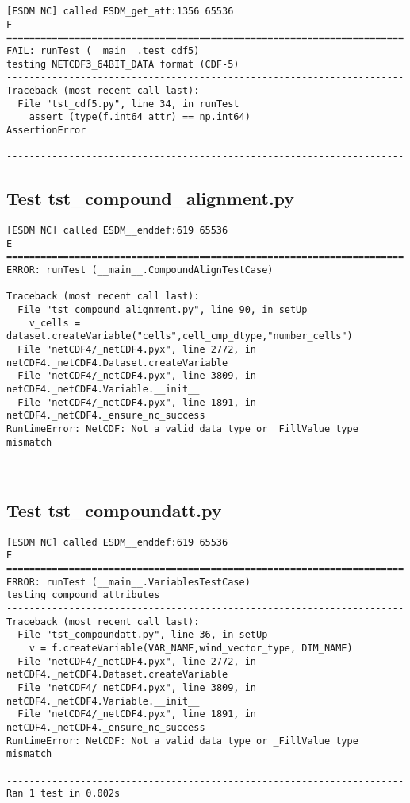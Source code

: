 \begin{verbatim}
[ESDM NC] called ESDM_get_att:1356 65536
F
======================================================================
FAIL: runTest (__main__.test_cdf5)
testing NETCDF3_64BIT_DATA format (CDF-5)
----------------------------------------------------------------------
Traceback (most recent call last):
  File "tst_cdf5.py", line 34, in runTest
    assert (type(f.int64_attr) == np.int64)
AssertionError

----------------------------------------------------------------------
\end{verbatim}

\subsection{Test tst\_compound\_alignment.py}

\begin{verbatim}
[ESDM NC] called ESDM__enddef:619 65536
E
======================================================================
ERROR: runTest (__main__.CompoundAlignTestCase)
----------------------------------------------------------------------
Traceback (most recent call last):
  File "tst_compound_alignment.py", line 90, in setUp
    v_cells = dataset.createVariable("cells",cell_cmp_dtype,"number_cells")
  File "netCDF4/_netCDF4.pyx", line 2772, in netCDF4._netCDF4.Dataset.createVariable
  File "netCDF4/_netCDF4.pyx", line 3809, in netCDF4._netCDF4.Variable.__init__
  File "netCDF4/_netCDF4.pyx", line 1891, in netCDF4._netCDF4._ensure_nc_success
RuntimeError: NetCDF: Not a valid data type or _FillValue type mismatch

----------------------------------------------------------------------
\end{verbatim}

\subsection{Test tst\_compoundatt.py}

\begin{verbatim}
[ESDM NC] called ESDM__enddef:619 65536
E
======================================================================
ERROR: runTest (__main__.VariablesTestCase)
testing compound attributes
----------------------------------------------------------------------
Traceback (most recent call last):
  File "tst_compoundatt.py", line 36, in setUp
    v = f.createVariable(VAR_NAME,wind_vector_type, DIM_NAME)
  File "netCDF4/_netCDF4.pyx", line 2772, in netCDF4._netCDF4.Dataset.createVariable
  File "netCDF4/_netCDF4.pyx", line 3809, in netCDF4._netCDF4.Variable.__init__
  File "netCDF4/_netCDF4.pyx", line 1891, in netCDF4._netCDF4._ensure_nc_success
RuntimeError: NetCDF: Not a valid data type or _FillValue type mismatch

----------------------------------------------------------------------
Ran 1 test in 0.002s
\end{verbatim}

